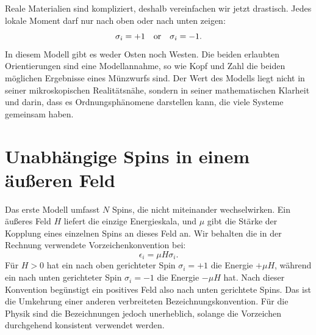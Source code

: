 Reale Materialien sind kompliziert, deshalb vereinfachen wir jetzt drastisch. Jedes lokale Moment darf nur nach oben oder nach unten zeigen:
\begin{equation}
 \sigma_i=+1\quad\hbox{or}\quad\sigma_i=-1.
 \label{eq:sm8-ising-spin}
\end{equation}
In diesem Modell gibt es weder Osten noch Westen. Die beiden erlaubten Orientierungen sind eine Modellannahme, so wie Kopf und Zahl die beiden möglichen Ergebnisse eines Münzwurfs sind. Der Wert des Modells liegt nicht in seiner mikroskopischen Realitätsnähe, sondern in seiner mathematischen Klarheit und darin, dass es Ordnungsphänomene darstellen kann, die viele Systeme gemeinsam haben.

\begin{classroomqa}
\end{classroomqa}

\section{Unabhängige Spins in einem äußeren Feld}

Das erste Modell umfasst \(N\) Spins, die nicht miteinander wechselwirken. Ein äußeres Feld \(H\) liefert die einzige Energieskala, und \(\mu\) gibt die Stärke der Kopplung eines einzelnen Spins an dieses Feld an. Wir behalten die in der Rechnung verwendete Vorzeichenkonvention bei:
\begin{equation}
 \epsilon_i=\mu H\sigma_i.
 \label{eq:sm8-single-spin-energy}
\end{equation}
Für \(H>0\) hat ein nach oben gerichteter Spin \(\sigma_i=+1\) die Energie \(+\mu H\), während ein nach unten gerichteter Spin \(\sigma_i=-1\) die Energie \(-\mu H\) hat. Nach dieser Konvention begünstigt ein positives Feld also nach unten gerichtete Spins. Das ist die Umkehrung einer anderen verbreiteten Bezeichnungskonvention. Für die Physik sind die Bezeichnungen jedoch unerheblich, solange die Vorzeichen durchgehend konsistent verwendet werden.

